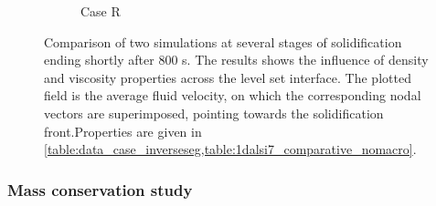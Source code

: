 \begin{figure}[htbp]
\begin{subfigure}{0.55\textwidth}
	\caption{Case R}
    \label{fig:1dalsi7_differentprops}
  \end{subfigure}
\caption{Comparison of two simulations at several stages of solidification ending shortly after 800 s.
The results shows the influence of density and viscosity properties across the level set interface.
The plotted field is the average fluid velocity, on which the corresponding nodal vectors are superimposed, pointing
towards the solidification front.Properties are given in \cref{table:data_case_inverseseg,table:1dalsi7_comparative_nomacro}.}
\label{fig:1dalsi7_caseA1R}
\end{figure}

\subsubsection{Mass conservation study}

